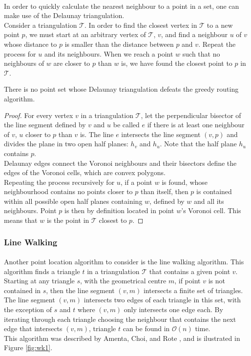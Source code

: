 \paragraph{}
In order to quickly calculate the nearest neighbour to a point in a set, one can make use of the Delaunay triangulation.\\
Consider a triangulation $\mathcal{T}$. In order to find the closest vertex in $\mathcal{T}$ to a new point $p$, we must start at an arbitrary vertex of $\mathcal{T}$, $v$, and find a neighbour $u$ of $v$ whose distance to $p$ is smaller than the distance between $p$ and $v$. Repeat the process for $u$ and its neighbours. When we reach a point $w$ such that no neighbours of $w$ are closer to $p$ than $w$ is, we have found the closest point to $p$ in $\mathcal{T}$.

\begin{theorem}
There is no point set whose Delaunay triangulation defeats the greedy routing algorithm.
\begin{proof}
For every vertex $v$ in a triangulation $\mathcal{T}$, let the perpendicular bisector of the line segment defined by $v$ and $u$ be called $e$ if there is at least one neighbour of $v$, $u$ closer to $p$ than $v$ is. The line $e$ intersects the line segment $(v,p)$ and divides the plane in two open half planes: $h_v$ and $h_u$. Note that the half plane $h_u$ contains $p$.\\
Delaunay edges connect the Voronoi neighbours and their bisectors define the edges of the Voronoi cells, which are convex polygons.\\
Repeating the process recursively for $u$, if a point $w$ is found, whose neighbourhood contains no points closer to $p$ than itself, then $p$ is contained within all possible open half planes containing $w$, defined by $w$ and all its neighbours. Point $p$ is then by definition located in point $w$'s Voronoi cell. This means that $w$ is the point in $\mathcal{T}$ closest to $p$.
\end{proof}
\end{theorem}
\subsubsection{Line Walking}
\paragraph{}
Another point location algorithm to consider is the line walking algorithm. This algorithm finds a triangle $t$ in a triangulation $\mathcal{T}$ that contains a given point $v$. \\
Starting at any triangle $s$, with the geometrical centre $m$, if point $v$ is not contained in $s$, then the line segment $(v,m)$ intersects a finite set of triangles.  
The line segment $(v,m)$ intersects two edges of each triangle in this set, with the exception of $s$ and $t$ where $(v,m)$ only intersects one edge each. 
By iterating through each triangle choosing the neighbour that contains the next edge that intersects $(v,m)$, triangle $t$ can be found in $\mathcal{O}(n)$ time.\\
This algorithm was described by Amenta, Choi, and Rote \cite{walking}, and is ilustrated in Figure \ref*{fig:wk1}.

